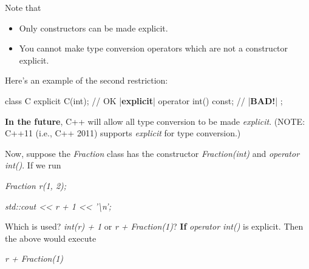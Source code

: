 Note that

\begin{itemize}
\item Only constructors can be made explicit.
\item You cannot make type conversion operators which are not a constructor
  explicit.
\end{itemize}

Here's an example of the second restriction:

\begin{consolethree}[escapeinside=||]
class C
{
    explicit C(int); // OK
    |{\bf explicit}| operator int() const; // |{\bf BAD!}|
};
\end{consolethree}

\textbf{In the future}, C++ will allow all type conversion to be made
\textit{explicit}. (NOTE: C++11 (i.e., C++ 2011) supports \textit{explicit}
for type conversion.)

Now, suppose the \textit{Fraction} class has the constructor
\textit{Fraction(int)} and \textit{operator int()}. If we run

\textit{Fraction r(1, 2);}

\textit{std::cout << r + 1 << '\textbackslash n';}

Which is used? \textit{int(r) + 1} or \textit{r + Fraction(1)}? \textbf{If} \textit{operator int()}
is explicit. Then the above would execute

\textit{r + Fraction(1)}


